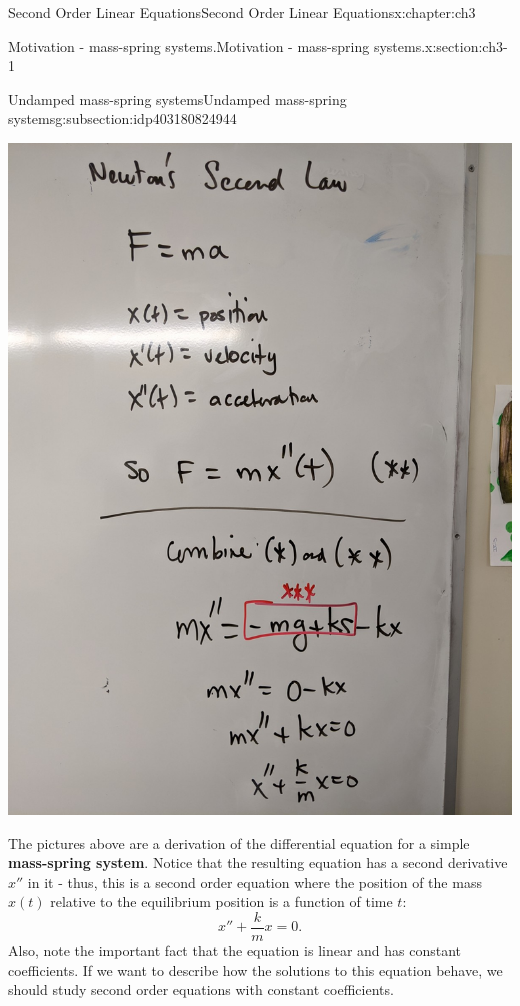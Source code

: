 \documentclass[oneside,10pt,]{book}
\newcommand{\terminology}[1]{\textbf{#1}}
\numberwithin{equation}{section}
\numberwithin{equation}{section}
\begin{document}
\begin{chapterptx}{Second Order Linear Equations}{}{Second Order Linear Equations}{}{}{x:chapter:ch3}
\begin{sectionptx}{Motivation - mass-spring systems.}{}{Motivation - mass-spring systems.}{}{}{x:section:ch3-1}
\begin{subsectionptx}{Undamped mass-spring systems}{}{Undamped mass-spring systems}{}{}{g:subsection:idp403180824944}
\begin{image}{0}{1}{0}
\includegraphics[width=\linewidth]{images/spring_diff_2.jpg}
\end{image}%
The pictures above are a derivation of the differential equation for a simple \terminology{mass-spring system}. Notice that the resulting equation has a second derivative \(x''\) in it - thus, this is a second order equation where the position of the mass \(x(t)\) relative to the equilibrium position is a function of time \(t\):%
\begin{equation*}
x'' + \frac{k}{m} x = 0.
\end{equation*}
Also, note the important fact that the equation is linear and has constant coefficients. If we want to describe how the solutions to this equation behave, we should study second order equations with constant coefficients.%
\end{subsectionptx}
%
%
\typeout{************************************************}
\typeout{************************************************}

\end{sectionptx}
\end{chapterptx}
\end{document}
